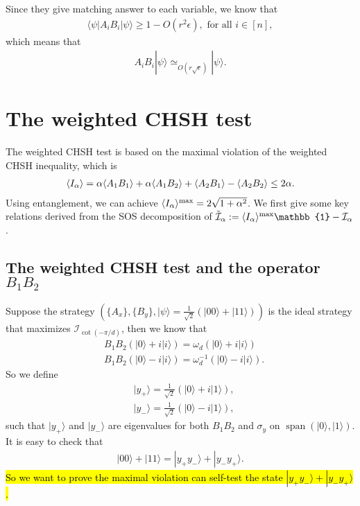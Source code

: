 \documentclass[11pt,letterpaper]{article}
\newcommand{\ket}[1]{|#1\rangle}
\newcommand{\bra}[1]{\langle#1|}
\DeclarePairedDelimiter{\ip}{\langle}{\rangle}
\DeclareMathOperator{\spn}{span}
\newcommand{\1}{\mathbb{1}}
\newcommand{\I}{\mathcal{I}}
\newcommand{\appd}[1]{\simeq_{#1}}
\theoremstyle{definition}
\begin{document}
Since they give matching answer to each variable, we know that 
\begin{align}
	\bra{\psi} A_i B_i \ket{\psi} \geq 1- O(r^2\epsilon), \text{ for all } i \in [n],
\end{align}
which means that
\begin{align}
	A_i  B_i \ket{\psi} \appd{O(r\sqrt{\epsilon})} \ket{\psi}.
\end{align}
\section{The weighted CHSH test}
\label{sec:weightedchsh}
The weighted CHSH test is based on the maximal violation of the weighted CHSH inequality,
which is
\begin{align}
	\ip{I_\alpha} = \alpha \ip{A_1B_1}+\alpha\ip{A_1B_2} + \ip{A_2B_1} - \ip{A_2B_2}\leq 2\alpha.
\end{align}
Using entanglement, we can achieve $\ip{I_\alpha}^{\max} = 2\sqrt{1+\alpha^2}$.
We first give some key relations derived from the SOS decomposition of $\tilde{\I}_\alpha := \ip{I_\alpha}^{\max}\1 - \I_\alpha$.
\subsection{The weighted CHSH test and the operator $B_1B_2$}
Suppose the strategy $\left(\{A_x\}, \{B_y\}, \ket{\psi}=\frac{1}{\sqrt{2}}(\ket{00}+\ket{11})\right)$ is the ideal strategy that maximizes $\I_{\cot(-\pi/d)}$, then
we know that
\begin{align}
	&B_1B_2 (\ket{0} + i\ket{i}) = \omega_d (\ket{0} + i\ket{i})\\
	&B_1B_2 (\ket{0} - i\ket{i}) = \omega_d^{-1} (\ket{0} - i\ket{i}).
\end{align}
So we define 
\begin{align}
	&\ket{y_+} = \frac{1}{\sqrt{2}}(\ket{0}+ i\ket{1}),\\
	&\ket{y_-}=\frac{1}{\sqrt{2}}(\ket{0}- i\ket{1}),
\end{align}	
such that $\ket{y_+}$ and $\ket{y_-}$ are eigenvalues for both $B_1B_2$ and $\sigma_y$ on $\spn(\ket{0}, \ket{1})$.
It is easy to check that 
\begin{align}
	\ket{00}+\ket{11} = \ket{y_+y_-} + \ket{y_-y_+}.
\end{align}
\hl{So we want to prove the maximal violation can self-test the state $\ket{y_+y_-} + \ket{y_-y_+}$.}
\end{document}
